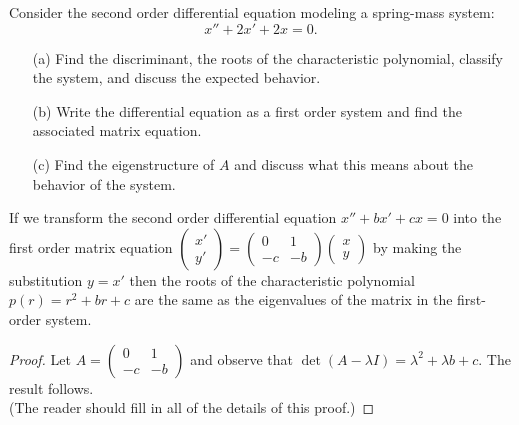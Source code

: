 \begin{problem}
    Consider the second order differential equation modeling a spring-mass system: 
    \[ x'' + 2x' + 2x = 0. \]
    \begin{enumerate}
        \item[(a)] Find the discriminant, the roots of the characteristic polynomial,
            classify the system, and discuss the expected behavior.
        \item[(b)] Write the differential equation as a first order system and find the
            associated matrix equation.
            \solution{
            \[ \begin{pmatrix} x' \\ y' \end{pmatrix} = \begin{pmatrix} 0 & 1 \\ -2 & -2
                \end{pmatrix} \begin{pmatrix} x \\ y \end{pmatrix}. \]
            }
        \item[(c)] Find the eigenstructure of $A$ and discuss what this means about the
            behavior of the system.
    \end{enumerate}
\end{problem}

\begin{thm}
    If we transform the second order differential equation $x'' + bx' + cx =0$ into the
    first order matrix equation $\begin{pmatrix} x' \\ y' \end{pmatrix} = \begin{pmatrix}
        0 & 1 \\ -c & -b \end{pmatrix} \begin{pmatrix} x \\ y \end{pmatrix}$ by making the
            substitution $y = x'$ then the roots of the characteristic polynomial $p(r) = r^2 +
            br + c$ are the same as the eigenvalues of the matrix in the first-order
            system.
\end{thm}
\begin{proof}
    Let $A = \begin{pmatrix} 0 & 1 \\ -c & -b \end{pmatrix}$ and observe that $\det(A
        -\lambda I) = \lambda^2 + \lambda b + c$.  The result follows.  \\ (The reader
        should fill in all of the details of this proof.) 
\end{proof}


